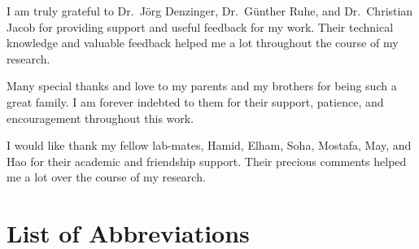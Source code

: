 \documentclass{ucalgthes1}
\theoremstyle{plain}
\theoremstyle{definition}
\begin{document}
I am truly grateful to Dr.~J{\"o}rg Denzinger, Dr.~G\"{u}nther Ruhe,  and Dr.~Christian Jacob for providing support and useful feedback for my work. Their technical knowledge and valuable feedback helped me a lot throughout the course of my research.

Many special thanks and love to my parents and my brothers for being such a great family. I am forever indebted to them for their support, patience, and encouragement throughout this work.


I would like thank my fellow lab-mates, Hamid, Elham, Soha, Mostafa, May, and Hao for their academic and friendship support. Their precious comments helped me a lot over the course of my research.


\begin{singlespace}
\newpage
{}
\tableofcontents
\pagestyle{plain}
\newpage
{}
\listoftables
\pagestyle{plain}
\newpage
{}
\listoffigures
\pagestyle{plain}
\clearpage
\clearpage          %
\end{singlespace}
\newpage
{}
\chapter*{\bf{List of Abbreviations}\hfill}
\listofsymbols
\pagestyle{plain}
\clearpage



\setcounter{page}{1}










\end{document}
